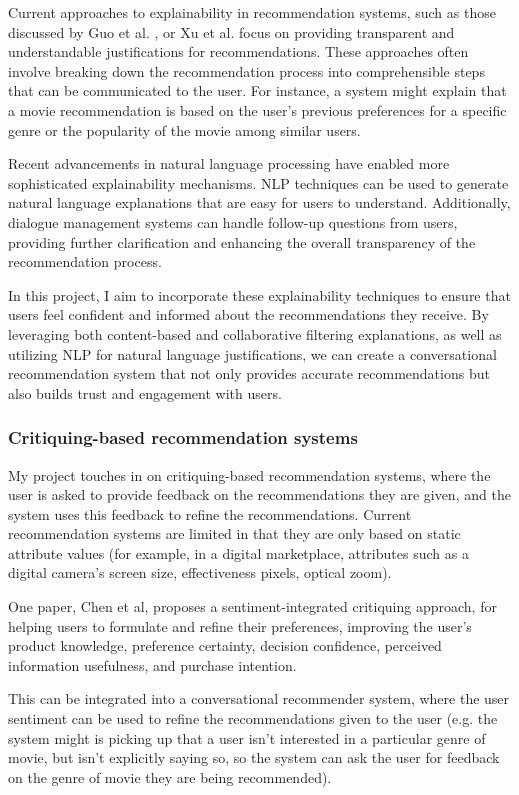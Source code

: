 Current approaches to explainability in recommendation systems, such as those discussed by Guo et al. \cite{Guo_2023}, or Xu et al. \cite{Tag_based_post_hoc} focus on providing transparent and understandable justifications for recommendations. These approaches often involve breaking down the recommendation process into comprehensible steps that can be communicated to the user. For instance, a system might explain that a movie recommendation is based on the user's previous preferences for a specific genre or the popularity of the movie among similar users.


Recent advancements in natural language processing have enabled more sophisticated explainability mechanisms. NLP techniques can be used to generate natural language explanations that are easy for users to understand. Additionally, dialogue management systems can handle follow-up questions from users, providing further clarification and enhancing the overall transparency of the recommendation process.

In this project, I aim to incorporate these explainability techniques to ensure that users feel confident and informed about the recommendations they receive. By leveraging both content-based and collaborative filtering explanations, as well as utilizing NLP for natural language justifications, we can create a conversational recommendation system that not only provides accurate recommendations but also builds trust and engagement with users.

\subsubsection{Critiquing-based recommendation systems}
My project touches in on critiquing-based recommendation systems, where the user is asked to provide feedback on the recommendations they are given, and the system uses this feedback to refine the recommendations.
Current recommendation systems are limited in that they are only based on static attribute values (for example, in a digital marketplace, attributes such as a digital camera’s screen size, effectiveness pixels, optical zoom).

One paper, Chen et al\cite{CHEN20194}, proposes a sentiment-integrated critiquing approach, for helping users to formulate and refine their preferences, improving the user's product knowledge, preference certainty, decision confidence, perceived information usefulness, and purchase intention.

This can be integrated into a conversational recommender system, where the user sentiment can be used to refine the recommendations given to the user (e.g. the system might is picking up that a user isn't interested in a particular genre of movie, but isn't explicitly saying so, so the system can ask the user for feedback on the genre of movie they are being recommended).

